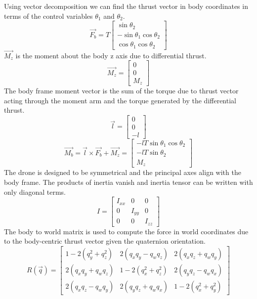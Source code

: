 \documentclass[]{article}
\begin{document}
	Using vector decomposition we can find the thrust vector in body coordinates in terms of the control variables $\theta_1$ and $\theta_2$.	
\[
\vec{F_b} = T
\begin{bmatrix}
	\sin{\theta_2}  \\
	-\sin{\theta_1}\cos{\theta_2}  \\
	\cos{\theta_1}\cos{\theta_2}
\end{bmatrix}
\]
$\vec{M_z}$ is the moment about the body z axis due to differential thrust.
        \[
	\vec{M_z} =
        \begin{bmatrix}
        0  \\
        0  \\
        M_z
        \end{bmatrix}
        \]
The body frame moment vector is the sum of the torque due to thrust vector acting through the moment arm and the torque generated by the differential thrust.
        \[
	\vec{l} =
        \begin{bmatrix}
        0  \\
        0  \\
        -l
        \end{bmatrix}
        \]
        	 \[
        \vec{M_b} = \vec{l} \times \vec{F_b} + \vec{M_z}=       
        \begin{bmatrix}
        -lT\sin{\theta_1}\cos{\theta_2}  \\
        -lT\sin{\theta_2}  \\
	M_z
        \end{bmatrix}
        \]
The drone is designed to be symmetrical and the principal axes align with the body frame. The products of inertia vanish and inertia tensor can be written with only diagonal terms.
         \[
        I =
        \begin{bmatrix}
        I_{xx} & 0 &0 \\
        0 & I_{yy }& 0 \\
        0 & 0 & I_{zz}
        \end{bmatrix}
        \]
The body to world matrix is used to compute the force in world coordinates due to the body-centric thrust vector given the quaternion orientation.
        \[
        R(\vec{q}) =
        \begin{bmatrix}
        1 - 2(q_y^2 + q_z^2) & 2(q_x q_y - q_w q_z) & 2(q_x q_z + q_w q_y) \\
        2(q_x q_y + q_w q_z) & 1 - 2(q_x^2 + q_z^2) & 2(q_y q_z - q_w q_x) \\
        2(q_x q_z - q_w q_y) & 2(q_y q_z + q_w q_x) & 1 - 2(q_x^2 + q_y^2)
        \end{bmatrix}
        \]
\end{document}
